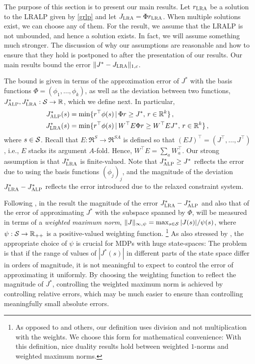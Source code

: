 \documentclass[twocolumn]{IEEEtran}
\begin{document}
The purpose of this section is to present our main results.
Let $\rlr$ be a solution to the LRALP given by \eqref{grlp}
and let $\Jlr = \Phi \rlr$. When multiple solutions exist, we can choose any of them.
For the result, we assume that the LRALP is not unbounded, and hence a solution exists. In fact, we will assume something much stronger. The discussion of why our assumptions are reasonable and how to ensure that they hold is postponed to after the presentation of our results.
Our main results bound the error $\norm{J^* - \Jlr}_{1,c}$.

The bound is given in terms of the approximation error of $J^*$ with the basis functions $\Phi= (\phi_1,\dots,\phi_k)$, as well as the deviation between two functions, $\Jalpo,\Jlro: \S \to \Re$, which we define next. In particular,
\begin{align*}
\Jalpo(s) & = \min\{ r^\top\phi(s) \,|\, \Phi r \ge J^*, \, r\in \Re^k \}\,,\\
\Jlro(s)    & = \min\{ r^\top\phi(s) \,|\, W^\top E \Phi r \ge W^\top E J^*, \, r\in \Re^k \}\,,
\end{align*}
where $s\in \S$. Recall that $E: \Re^S \to \Re^{SA}$ is defined so that $(E J)^\top = (J^\top, \dots, J^\top)$, i.e., $E$ stacks its argument $A$-fold. Hence, $W^\top E = \sum_a W_a^\top$. Our strong assumption is that $\Jlro$ is finite-valued. Note that $\Jalpo\ge J^*$ reflects the error due to using the basis functions $(\phi_j)_j$, and the magnitude of the deviation $\Jlro-\Jalpo$ reflects the error introduced due to the relaxed constraint system. 

Following \citet{ALP,CS}, 
in the result the magnitude of the error $\Jlro-\Jalpo$ and also that of the error
of approximating $J^*$ with the subspace spanned by $\Phi$, 
will be measured in terms of a \emph{weighted maximum norm}, 
$\norm{J}_{\infty,\psi} = \max_{s\in \S} |J(s)|/\psi(s)$, 
where $\psi: \S \to \Re_{++}$ is a positive-valued weighting function.%
\footnote{As opposed to \citet{ALP} and others, our definition uses division and not multiplication with the weights.
We choose this form for mathematical convenience:
With this definition, nice duality results hold between weighted $1$-norms and weighted maximum norms.
}
As also stressed by \citeauthor{ALP}, 
the appropriate choice of $\psi$ is crucial for MDPs with huge state-spaces:
The problem is that if the range of values of $|J^*(s)|$ in different parts of the state space
differ in orders of magnitude, it is not meaningful to expect to control the error of approximating it uniformly.
By choosing the weighting function to reflect the magnitude of $J^*$, controlling the weighted maximum norm
is achieved by controlling relative errors, which may be much easier to ensure than controlling meaningfully small
absolute errors.
\end{document}
